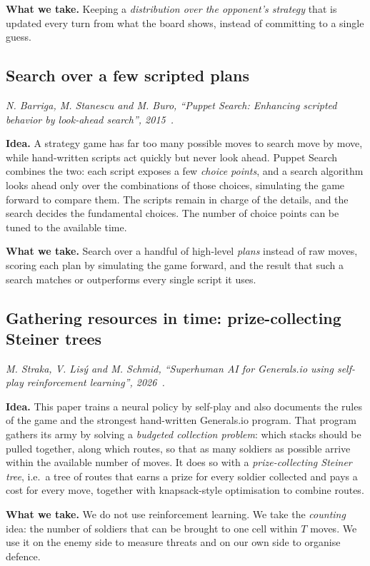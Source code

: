 \textbf{What we take.} Keeping a \emph{distribution over the opponent's strategy} that is updated every turn
from what the board shows, instead of committing to a single guess.

\subsection{Search over a few scripted plans}

\emph{N. Barriga, M. Stanescu and M. Buro, ``Puppet Search: Enhancing scripted behavior by look-ahead
search'', 2015~\cite{barriga}.}

\textbf{Idea.} A strategy game has far too many possible moves to search move by move, while hand-written
scripts act quickly but never look ahead. Puppet Search combines the two: each script exposes a few
\emph{choice points}, and a search algorithm looks ahead only over the combinations of those choices,
simulating the game forward to compare them. The scripts remain in charge of the details, and the search
decides the fundamental choices. The number of choice points can be tuned to the available time.

\textbf{What we take.} Search over a handful of high-level \emph{plans} instead of raw moves, scoring each
plan by simulating the game forward, and the result that such a search matches or outperforms every single script it
uses.

\subsection{Gathering resources in time: prize-collecting Steiner trees}

\emph{M. Straka, V. Lis\'y and M. Schmid, ``Superhuman AI for Generals.io using self-play reinforcement
learning'', 2026~\cite{straka}.}

\textbf{Idea.} This paper trains a neural policy by self-play and also documents the rules of the game and
the strongest hand-written Generals.io program. That program gathers its army by solving a \emph{budgeted
collection problem}: which stacks should be pulled together, along which routes, so that as many soldiers as
possible arrive within the available number of moves. It does so with a \emph{prize-collecting Steiner
tree}, i.e.\ a tree of routes that earns a prize for every soldier collected and pays a cost for every move,
together with knapsack-style optimisation to combine routes.

\textbf{What we take.} We do not use reinforcement learning. We take the \emph{counting} idea: the number of
soldiers that can be brought to one cell within $T$ moves. We use it on the enemy side to measure threats and
on our own side to organise defence.

